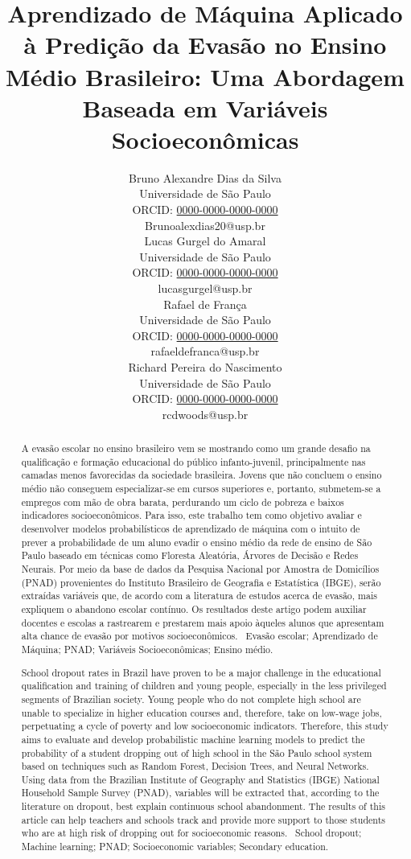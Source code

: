 \documentclass[english, spanish, brazilian]{RBIEarticle} %
\title{Aprendizado de Máquina Aplicado à Predição da Evasão no Ensino Médio Brasileiro: Uma Abordagem Baseada em Variáveis Socioeconômicas}
\author{%
	\parbox{3.8cm}{%
		Bruno Alexandre Dias da Silva\\
		Universidade de São Paulo\\
		ORCID: \href{https://orcid.org/0000-0000-0000-0000}{0000-0000-0000-0000}\\
		Brunoalexdias20@usp.br
	}
        \hspace{0.3cm}
	\parbox{3.8cm}{%
		Lucas Gurgel do Amaral\\
		Universidade de São Paulo\\
		ORCID: \href{https://orcid.org/0000-0000-0000-0000}{0000-0000-0000-0000}\\
		lucasgurgel@usp.br
	}
        \hspace{0.3cm}
        \parbox{3.8cm}{%
		Rafael de França\\
		Universidade de São Paulo\\
		ORCID: \href{https://orcid.org/0000-0000-0000-0000}{0000-0000-0000-0000}\\
		rafaeldefranca@usp.br
	}
        \hspace{0.3cm}
	\parbox{3.9cm}{\raggedright%
		Richard Pereira do Nascimento\\
		Universidade de São Paulo\\
		ORCID: \href{https://orcid.org/0000-0000-0000-0000}{0000-0000-0000-0000}\\
		rcdwoods@usp.br
	}
}
\begin{document}
\maketitle

\begin{otherlanguage}{brazilian}
\begin{abstract}
A evasão escolar no ensino brasileiro vem se mostrando como um grande desafio na qualificação e formação educacional do público infanto-juvenil, principalmente nas camadas menos favorecidas da sociedade brasileira. Jovens que não concluem o ensino médio não conseguem especializar-se em cursos superiores e, portanto, submetem-se a empregos com mão de obra barata, perdurando um ciclo de pobreza e baixos indicadores socioeconômicos. Para isso, este trabalho tem como objetivo avaliar e desenvolver modelos probabilísticos de aprendizado de máquina com o intuito de prever a probabilidade de um aluno evadir o ensino médio da rede de ensino de São Paulo baseado em técnicas como Floresta Aleatória, Árvores de Decisão e Redes Neurais. Por meio da base de dados da Pesquisa Nacional por Amostra de Domicílios (PNAD) provenientes do Instituto Brasileiro de Geografia e Estatística (IBGE), serão extraídas variáveis que, de acordo com a literatura de estudos acerca de evasão, mais expliquem o abandono escolar contínuo. Os resultados deste artigo podem auxiliar docentes e escolas a rastrearem e prestarem mais apoio àqueles alunos que apresentam alta chance de evasão por motivos socioeconômicos.  
\keywords\ Evasão escolar; Aprendizado de Máquina; PNAD; Variáveis Socioeconômicas; Ensino médio.
\end{abstract}
\end{otherlanguage}

\begin{otherlanguage}{english}
\begin{abstract}
School dropout rates in Brazil have proven to be a major challenge in the educational qualification and training of children and young people, especially in the less privileged segments of Brazilian society. Young people who do not complete high school are unable to specialize in higher education courses and, therefore, take on low-wage jobs, perpetuating a cycle of poverty and low socioeconomic indicators. Therefore, this study aims to evaluate and develop probabilistic machine learning models to predict the probability of a student dropping out of high school in the São Paulo school system based on techniques such as Random Forest, Decision Trees, and Neural Networks. Using data from the Brazilian Institute of Geography and Statistics (IBGE) National Household Sample Survey (PNAD), variables will be extracted that, according to the literature on dropout, best explain continuous school abandonment. The results of this article can help teachers and schools track and provide more support to those students who are at high risk of dropping out for socioeconomic reasons.
\keywords\ School dropout; Machine learning; PNAD; Socioeconomic variables; Secondary education.
\end{abstract}
\end{otherlanguage}
\end{document}
